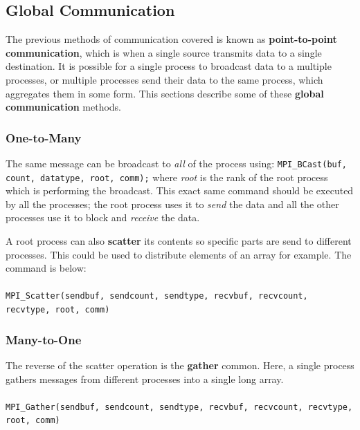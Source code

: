 \documentclass{article}
\begin{document}
\subsection{Global Communication}

The previous methods of communication covered is known as \textbf{point-to-point communication}, which is when a single source transmits data to a single destination. It is possible for a single process to broadcast data to a multiple processes, or multiple processes send their data to the same process, which aggregates them in some form. This sections describe some of these \textbf{global communication} methods.

\subsubsection{One-to-Many}

The same message can be broadcast to \textit{all} of the process using:
\texttt{MPI\_BCast(buf, count, datatype, root, comm);}
where \textit{root} is the rank of the root process which is performing the broadcast. This exact same command should be executed by all the processes; the root process uses it to \textit{send} the data and all the other processes use it to block and \textit{receive} the data.

A root process can also \textbf{scatter} its contents so specific parts are send to different processes. This could be used to distribute elements of an array for example. The command is below:

\paragraph{} \texttt{MPI\_Scatter(sendbuf, sendcount, sendtype, recvbuf, recvcount, recvtype, root, comm)}

\subsubsection{Many-to-One}

The reverse of the scatter operation is the \textbf{gather} common. Here, a single process gathers messages from different processes into a single long array.

\paragraph{} \texttt{MPI\_Gather(sendbuf, sendcount, sendtype, recvbuf, recvcount, recvtype, root, comm)}
\end{document}
